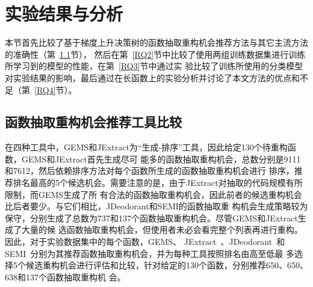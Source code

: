 \section{实验结果与分析}
本节首先比较了基于梯度上升决策树的函数抽取重构机会推荐方法与其它主流方法的准确性（第~\ref{RQ1}节），
然后在第~\ref{RQ2}节中比较了使用两组训练数据集进行训练所学习到的模型的性能，在第~\ref{RQ3}节中通过实
验比较了训练所使用的分类模型对实验结果的影响，最后通过在长函数上的实验分析并讨论了本文方法的优点和不
足（第~\ref{RQ4}节）。

\subsection{函数抽取重构机会推荐工具比较}\label{RQ1}
在四种工具中，GEMS和JExtract为``生成-排序''工具，因此给定130个待重构函数，GEMS和JExtract首先生成尽可
能多的函数抽取重构机会，总数分别是9111和7612，然后依赖排序方法对每个函数所生成的函数抽取重构机会进行
排序，推荐排名最高的5个候选机会。需要注意的是，由于JExtract对抽取的代码规模有所限制，而GEMS生成了所
有合法的函数抽取重构机会，因此前者的候选重构机会比后者要少。与它们相比，JDeodorant和SEMI的函数抽取重
构机会生成策略较为保守，分别生成了总数为737和137个函数抽取重构机会。尽管GEMS和JExtract生成了大量的候
选函数抽取重构机会，但使用者未必会看完整个列表再进行重构。因此，对于实验数据集中的每个函数，GEMS、
JExtract~\cite{silva:ICPC14}、JDeodorant~\cite{tsantalis2011identification}和
SEMI~\cite{charalampidou2016identifying}分别为其推荐函数抽取重构机会，并为每种工具按照排名由高至低最
多选择5个候选重构机会进行评估和比较，针对给定的130个函数，分别推荐650、650、638和137个函数抽取重构机
会。

